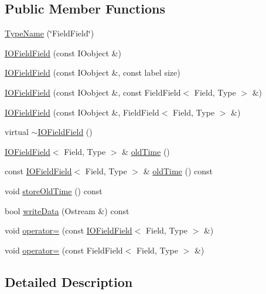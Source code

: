 \subsection*{Public Member Functions}
\begin{DoxyCompactItemize}
\item 
\hyperlink{classFoam_1_1IOFieldField_a861180b574d6d7465824a77a9fba14ff}{Type\+Name} (\char`\"{}Field\+Field\char`\"{})
\item 
\hyperlink{classFoam_1_1IOFieldField_aa629c2e21935ff2655d99399a802328d}{I\+O\+Field\+Field} (const I\+Oobject \&)
\item 
\hyperlink{classFoam_1_1IOFieldField_a48d0c32d42597d6f3ca2c632c48e8117}{I\+O\+Field\+Field} (const I\+Oobject \&, const label size)
\item 
\hyperlink{classFoam_1_1IOFieldField_a83983d86369d797a75c500598c29c9d1}{I\+O\+Field\+Field} (const I\+Oobject \&, const Field\+Field$<$ Field, Type $>$ \&)
\item 
\hyperlink{classFoam_1_1IOFieldField_ac084d1cdf33b43ec14feaaa7f49ffbee}{I\+O\+Field\+Field} (const I\+Oobject \&, Field\+Field$<$ Field, Type $>$ \&)
\item 
virtual \hyperlink{classFoam_1_1IOFieldField_a65d6c8f3485a69b5b420fe3b3119c89f}{$\sim$\+I\+O\+Field\+Field} ()
\item 
\hyperlink{classFoam_1_1IOFieldField}{I\+O\+Field\+Field}$<$ Field, Type $>$ \& \hyperlink{classFoam_1_1IOFieldField_a4c505b9f9b54bd319780f7cdb965cdbf}{old\+Time} ()
\item 
const \hyperlink{classFoam_1_1IOFieldField}{I\+O\+Field\+Field}$<$ Field, Type $>$ \& \hyperlink{classFoam_1_1IOFieldField_aaff858b9643bc672663fa2d0867ab150}{old\+Time} () const
\item 
void \hyperlink{classFoam_1_1IOFieldField_a0f5f57d381bcb5e14908935b02328554}{store\+Old\+Time} () const
\item 
bool \hyperlink{classFoam_1_1IOFieldField_a25900c366cb0a98321899fde6c66dab7}{write\+Data} (Ostream \&) const
\item 
void \hyperlink{classFoam_1_1IOFieldField_a0a45aa2650bda18bce4db1f9bea7c510}{operator=} (const \hyperlink{classFoam_1_1IOFieldField}{I\+O\+Field\+Field}$<$ Field, Type $>$ \&)
\item 
void \hyperlink{classFoam_1_1IOFieldField_ab7eca532f0f9cc82ca81a0ee1aac9b00}{operator=} (const Field\+Field$<$ Field, Type $>$ \&)
\end{DoxyCompactItemize}


\subsection{Detailed Description}
